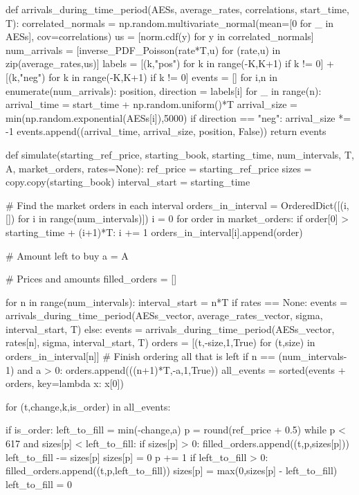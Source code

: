 def arrivals_during_time_period(AESs, average_rates, correlations, start_time, T):
    correlated_normals = np.random.multivariate_normal(mean=[0 for _ in AESs], cov=correlations)
    us = [norm.cdf(y) for y in correlated_normals]
    num_arrivals = [inverse_PDF_Poisson(rate*T,u) for (rate,u) in zip(average_rates,us)]
    labels = [(k,"pos") for k in range(-K,K+1) if k != 0] + [(k,"neg") for k in range(-K,K+1) if k != 0]
    events = []
    for i,n in enumerate(num_arrivals):
        position, direction = labels[i]
        for _ in range(n):
            arrival_time = start_time + np.random.uniform()*T
            arrival_size = min(np.random.exponential(AESs[i]),5000)
            if direction == "neg":
                arrival_size *= -1
            events.append((arrival_time, arrival_size, position, False))
    return events
    
def simulate(starting_ref_price, starting_book, starting_time, num_intervals, T, A, market_orders, rates=None):
    ref_price = starting_ref_price
    sizes = copy.copy(starting_book)
    interval_start = starting_time
    
    # Find the market orders in each interval
    orders_in_interval = OrderedDict([(i,[]) for i in range(num_intervals)])
    i = 0
    for order in market_orders:
        if order[0] > starting_time + (i+1)*T:
            i += 1
        orders_in_interval[i].append(order)
            
    # Amount left to buy
    a = A
    
    # Prices and amounts
    filled_orders = []
    
    
    for n in range(num_intervals):       
        interval_start = n*T
        if rates == None:
            events = arrivals_during_time_period(AESs_vector, average_rates_vector, sigma, interval_start, T)
        else:
            events = arrivals_during_time_period(AESs_vector, rates[n], sigma, interval_start, T)
        orders = [(t,-size,1,True) for (t,size) in orders_in_interval[n]]
        # Finish ordering all that is left
        if n == (num_intervals-1) and a > 0:
            orders.append(((n+1)*T,-a,1,True))
        all_events = sorted(events + orders, key=lambda x: x[0])
        
        for (t,change,k,is_order) in all_events:
                
            if is_order:
                left_to_fill = min(-change,a)
                p = round(ref_price + 0.5)
                while p < 617 and sizes[p] < left_to_fill:
                    if sizes[p] > 0:
                        filled_orders.append((t,p,sizes[p]))
                    left_to_fill -= sizes[p]
                    sizes[p] = 0
                    p += 1
                if left_to_fill > 0:
                    filled_orders.append((t,p,left_to_fill))
                sizes[p] = max(0,sizes[p] - left_to_fill)
                left_to_fill = 0
                
